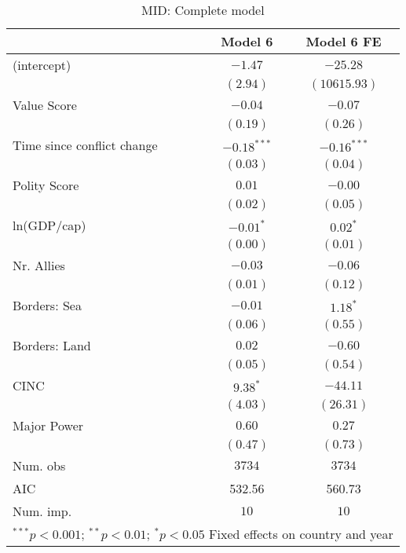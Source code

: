 
\begin{table}
\begin{center}
\begin{tabular}{l c c}
\toprule
 & Model 6 & Model 6 FE \\
\midrule
(intercept)                & $-1.47$       & $-25.28$      \\
                           & $(2.94)$      & $(10615.93)$  \\
Value Score                & $-0.04$       & $-0.07$       \\
                           & $(0.19)$      & $(0.26)$      \\
Time since conflict change & $-0.18^{***}$ & $-0.16^{***}$ \\
                           & $(0.03)$      & $(0.04)$      \\
Polity Score               & $0.01$        & $-0.00$       \\
                           & $(0.02)$      & $(0.05)$      \\
ln(GDP/cap)                & $-0.01^{*}$   & $0.02^{*}$    \\
                           & $(0.00)$      & $(0.01)$      \\
Nr. Allies                 & $-0.03$       & $-0.06$       \\
                           & $(0.01)$      & $(0.12)$      \\
Borders: Sea               & $-0.01$       & $1.18^{*}$    \\
                           & $(0.06)$      & $(0.55)$      \\
Borders: Land              & $0.02$        & $-0.60$       \\
                           & $(0.05)$      & $(0.54)$      \\
CINC                       & $9.38^{*}$    & $-44.11$      \\
                           & $(4.03)$      & $(26.31)$     \\
Major Power                & $0.60$        & $0.27$        \\
                           & $(0.47)$      & $(0.73)$      \\
\midrule
Num. obs                   & $3734$        & $3734$        \\
AIC                        & 532.56        & 560.73        \\
Num. imp.                  & $10$          & $10$          \\
\bottomrule
\multicolumn{3}{l}{\scriptsize{$^{***}p<0.001$; $^{**}p<0.01$; $^{*}p<0.05$ 
 Fixed effects on country and year}}
\end{tabular}
\caption{MID: Complete model}
\label{MID_3}
\end{center}
\end{table}
